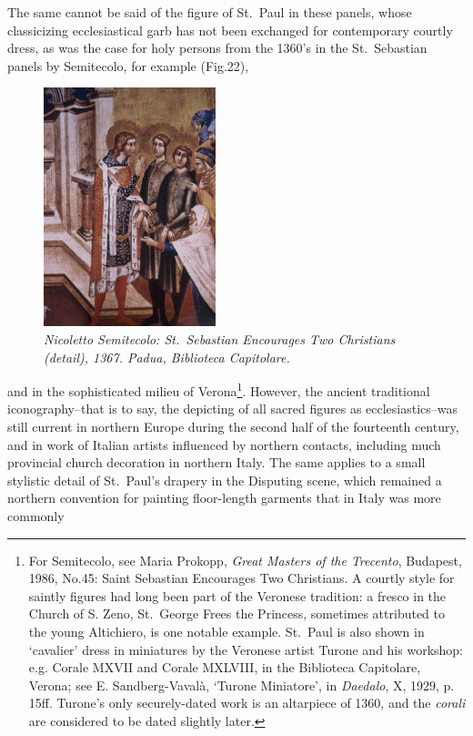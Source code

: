 \documentclass[a4paper,12pt]{article}
\begin{document}
The same cannot be said of the figure of St.~Paul in these panels,
whose classicizing ecclesiastical garb has not been exchanged for
contemporary courtly dress, as was the case for holy persons from the
1360's in the St.~Sebastian panels by Semitecolo, for example
(Fig.22), 
\begin{figure}[htbp]
\centering
\includegraphics[width=5cm]{pics/fig22.png}
\caption[Nicoletto Semitecolo: St.~Sebastian Encourages Two Christians
(detail)] 
{\it Nicoletto Semitecolo: St.~Sebastian Encourages Two Christians
(detail), 1367.  Padua, Biblioteca Capitolare.}
\end{figure}
and in the sophisticated milieu of Verona\footnote{For
Semitecolo, see Maria Prokopp, \textit{Great Masters of the Trecento},
Budapest, 1986, No.45: Saint Sebastian Encourages Two Christians. A
courtly style for saintly figures had long been part of the Veronese
tradition: a fresco in the Church of S. Zeno, St.~George Frees the
Princess, sometimes attributed to the young Altichiero, is one notable
example. St.~Paul is also shown in `cavalier' dress in miniatures by
the Veronese artist Turone and his workshop: e.g. Corale MXVII and
Corale MXLVIII, in the Biblioteca Capitolare, Verona; see
E. Sandberg-Vaval\`a, `Turone Miniatore', in \textit{Daedalo}, X, 1929,
p. 15ff. Turone's only securely-dated work is an altarpiece of 1360,
and the \textit{corali} are considered to be dated slightly
later.}. However, the ancient traditional iconography--that is to
say, the depicting of all sacred figures as ecclesiastics--was still
current in northern Europe during the second half of the fourteenth
century, and in work of Italian artists influenced by northern
contacts, including much provincial church decoration in northern
Italy. The same applies to a small stylistic detail of St.~Paul's
drapery in the Disputing scene, which remained a northern convention
for painting floor-length garments that in Italy was more commonly
\end{document}
